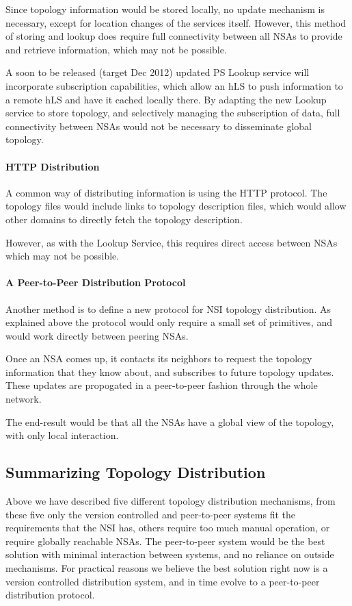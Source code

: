 \documentclass[12pt]{article}  %
\begin{document}
Since topology information would be stored locally, 
no update mechanism is necessary, except for location changes of the services itself. 
However, this method of storing and lookup does require full connectivity between 
all NSAs to provide and retrieve information, which may not be possible.


 A soon to be released (target Dec 2012) updated PS Lookup service 
will incorporate subscription capabilities, which allow an hLS to push information 
to a remote hLS and have it cached locally there. By adapting the new Lookup service 
to store topology, and selectively managing the subscription of data, full connectivity 
between NSAs would not be necessary to disseminate global topology.


\paragraph{HTTP Distribution}

 A common way of distributing information is using the HTTP protocol. 
The topology files would include links to topology description files, which would 
allow other domains to directly fetch the topology description.


However, as with the Lookup Service, this requires 
direct access between NSAs which may not be possible.


\paragraph{A Peer-to-Peer Distribution Protocol}

 Another method is to define a new protocol for NSI topology distribution. 
As explained above the protocol would only require a small set of primitives, and 
would work directly between peering NSAs.


Once an NSA comes up, it contacts its neighbors to 
request the topology information that they know about, and subscribes to future 
topology updates. These updates are propogated in a peer-to-peer fashion through 
the whole network.


The end-result would be that all the NSAs have a 
global view of the topology, with only local interaction.


\subsection{Summarizing Topology Distribution}

 Above we have described five different topology distribution mechanisms, 
from these five only the version controlled and peer-to-peer systems fit the requirements 
that the NSI has, others require too much manual operation, or require globally 
reachable NSAs. The peer-to-peer system would be the best solution with minimal 
interaction between systems, and no reliance on outside mechanisms. For practical 
reasons we believe the best solution right now is a version controlled distribution 
system, and in time evolve to a peer-to-peer distribution protocol.
\end{document}
